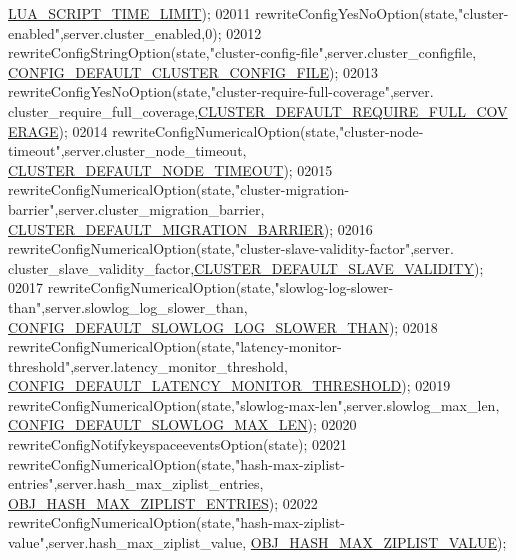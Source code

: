 \begin{DoxyCode}
{{{{{{{{{{{{{{{{{{{{{{{{{{{{      \hyperlink{server_8h_ab72fac70fbc902a7f106f4c710e08271}{LUA\_SCRIPT\_TIME\_LIMIT});
02011     rewriteConfigYesNoOption(state,\textcolor{stringliteral}{"cluster-enabled"},server.cluster\_enabled,0);
02012     rewriteConfigStringOption(state,\textcolor{stringliteral}{"cluster-config-file"},server.cluster\_configfile,
      \hyperlink{server_8h_a5b0c46fd63529819e2c0189003d72122}{CONFIG\_DEFAULT\_CLUSTER\_CONFIG\_FILE});
02013     rewriteConfigYesNoOption(state,\textcolor{stringliteral}{"cluster-require-full-coverage"},server.
      cluster\_require\_full\_coverage,\hyperlink{cluster_8h_aa27e3466414a1464e6f2721b8872827d}{CLUSTER\_DEFAULT\_REQUIRE\_FULL\_COVERAGE});
02014     rewriteConfigNumericalOption(state,\textcolor{stringliteral}{"cluster-node-timeout"},server.cluster\_node\_timeout,
      \hyperlink{cluster_8h_acb94b0516dcfb9814e13dfe97f3ad6b1}{CLUSTER\_DEFAULT\_NODE\_TIMEOUT});
02015     rewriteConfigNumericalOption(state,\textcolor{stringliteral}{"cluster-migration-barrier"},server.cluster\_migration\_barrier,
      \hyperlink{cluster_8h_a1895138f4125c5dce77e8fe28c9bd8d1}{CLUSTER\_DEFAULT\_MIGRATION\_BARRIER});
02016     rewriteConfigNumericalOption(state,\textcolor{stringliteral}{"cluster-slave-validity-factor"},server.
      cluster\_slave\_validity\_factor,\hyperlink{cluster_8h_a44b183827017eca27648d5991fc50b13}{CLUSTER\_DEFAULT\_SLAVE\_VALIDITY});
02017     rewriteConfigNumericalOption(state,\textcolor{stringliteral}{"slowlog-log-slower-than"},server.slowlog\_log\_slower\_than,
      \hyperlink{server_8h_a3cf317db9aeeba99be3654b11d3d0580}{CONFIG\_DEFAULT\_SLOWLOG\_LOG\_SLOWER\_THAN});
02018     rewriteConfigNumericalOption(state,\textcolor{stringliteral}{"latency-monitor-threshold"},server.latency\_monitor\_threshold,
      \hyperlink{server_8h_a20a7f934b2eceae8fdbb1ac112a783c3}{CONFIG\_DEFAULT\_LATENCY\_MONITOR\_THRESHOLD});
02019     rewriteConfigNumericalOption(state,\textcolor{stringliteral}{"slowlog-max-len"},server.slowlog\_max\_len,
      \hyperlink{server_8h_ada65a939812527070ed001e451d9bc54}{CONFIG\_DEFAULT\_SLOWLOG\_MAX\_LEN});
02020     rewriteConfigNotifykeyspaceeventsOption(state);
02021     rewriteConfigNumericalOption(state,\textcolor{stringliteral}{"hash-max-ziplist-entries"},server.hash\_max\_ziplist\_entries,
      \hyperlink{server_8h_a41a8473748a5eeafbd30b20f22177c51}{OBJ\_HASH\_MAX\_ZIPLIST\_ENTRIES});
02022     rewriteConfigNumericalOption(state,\textcolor{stringliteral}{"hash-max-ziplist-value"},server.hash\_max\_ziplist\_value,
      \hyperlink{server_8h_a63842e277a2ccef80f42cbae07c9f5d8}{OBJ\_HASH\_MAX\_ZIPLIST\_VALUE});
}}}}}}}}}}}}}}}}}}}}}}}}}}}}
\end{DoxyCode}
